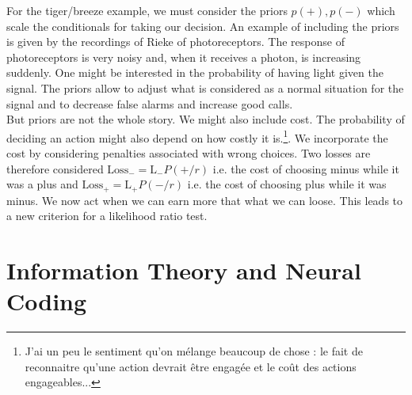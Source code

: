 \documentclass[10pt,a4paper]{article}
\begin{document}
For the tiger/breeze example, we must consider the priors $p(+), p(-)$ which scale the conditionals for taking our decision. An example of including the priors is given by the recordings of Rieke of photoreceptors. The response of photoreceptors is very noisy and, when it receives a photon, is increasing suddenly. One might be interested in the probability of having light given the signal. The priors allow to adjust what is considered as a normal situation for the signal and to decrease false alarms and increase good calls.\\

But priors are not the whole story. We might also include cost. The probability of deciding an action might also depend on how costly it is.\footnote{J'ai un peu le sentiment qu'on mélange beaucoup de chose : le fait de reconnaitre qu'une action devrait être engagée et le coût des actions engageables...}. We incorporate the cost by considering penalties associated with wrong choices. Two losses are therefore considered $\mbox{Loss}_- = \mbox{L}_- P(+/r)$ i.e. the cost of choosing minus while it was a plus and $\mbox{Loss}_+ = \mbox{L}_+ P(-/r)$ i.e. the cost of choosing plus while it was minus. We now act when we can earn more that what we can loose.  This leads to a new criterion for a likelihood ratio test.





\section{Information Theory and Neural Coding}
\end{document}
